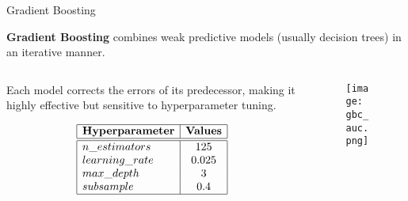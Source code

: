 \begin{frame}{Gradient Boosting}

    \textbf{Gradient Boosting} combines weak predictive models (usually decision trees) in an iterative manner.

    \begin{columns}
        \begin{column}{0.45\textwidth}
            Each model corrects the errors of its predecessor, making it highly effective but sensitive to hyperparameter tuning.

            \vspace{-0.1em}

            {\small
            $$
            \begin{array}{|l|c|}
                \hline
                \textbf{Hyperparameter} & \textbf{Values} \\
                \hline
                \hline
                n\_estimators & 125 \\
                learning\_rate & 0.025 \\
                max\_depth & 3 \\
                subsample & 0.4 \\
                \hline
            \end{array}
            $$
            }
        \end{column}
            \begin{column}{0.55\textwidth}
                \begin{figure}
                    \centering
                    \vfill
                    \texttt{[image: gbc\_auc.png]}
                \end{figure}
            \end{column}
    \end{columns}

\end{frame}

